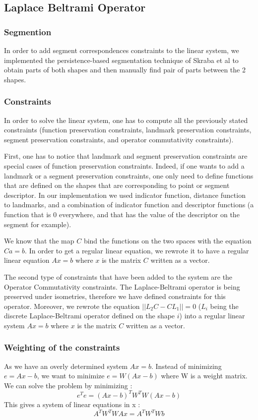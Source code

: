 \documentclass[10pt,twocolumn,letterpaper]{article}
\begin{document}
\subsection{Laplace Beltrami Operator}
\subsubsection*{Segmention} %
In order to add segment correspondences constraints to the linear system, we implemented the persistence-based segmentation technique of Skraba et al to obtain parts of both shapes and then manually find pair of parts between the 2 shapes.
\subsubsection*{Constraints} %
In order to solve the linear system, one has to compute all the previously stated constraints (function preservation constraints, landmark preservation constraints, segment preservation constraints, and operator commutativity constraints). 

First, one has to notice that landmark and segment preservation constraints are special cases of function preservation constraints. Indeed, if one wants to add a landmark or a segment preservation constraints, one only need to define functions that are defined on the shapes that are corresponding to point or segment descriptor. In our implementation we used indicator function, distance function to landmarks, and a combination of indicator function and descriptor functions (a function that is $0$ everywhere, and that has the value of the descriptor on the segment for example). 

We know that the map $C$ bind the functions on the two spaces with the equation $Ca = b$. In order to get a regular linear equation, we rewrote it to have a regular linear equation $Ax = b$ where $x$ is the matrix $C$ written as a vector.

The second type of constraints that have been added to the system are the Operator Commutativity constraints. The Laplace-Beltrami operator is being preserved under isometries, therefore we have defined constraints for this operator. Moreover, we rewrote the equation $||L_{2}C - CL_{1}|| = 0$ ($L_{i}$ being the discrete Laplace-Beltrami operator defined on the shape $i$) into a regular linear system $Ax = b$ where $x$ is the matrix $C$ written as a vector. 

\subsubsection*{Weighting of the constraints}
As we have an overly determined system $Ax = b$. Instead of minimizing $e = Ax-b$, we want to minimize $e = W(Ax-b)$ where W is a weight matrix. We can solve the problem by minimizing :
\begin{equation}
e^{T}e = (Ax-b)^{T}W^{T}W(Ax-b)
\end{equation}
This gives a system of linear equations in x :
\begin{equation}
A^{T}W^{T}WAx = A^{T}W^{T}Wb
\end{equation}
\end{document}

